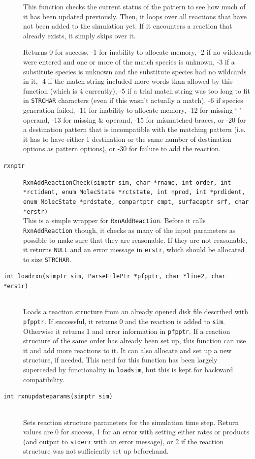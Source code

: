\documentclass {scrbook}
\newcommand {\ttt} {\texttt}
\begin{document}
\begin{description}
This function checks the current status of the pattern to see how much of it has been updated previously. Then, it loops over all reactions that have not been added to the simulation yet. If it encounters a reaction that already exists, it simply skips over it.

Returns 0 for success, -1 for inability to allocate memory, -2 if no wildcards were entered and one or more of the match species is unknown, -3 if a substitute species is unknown and the substitute species had no wildcards in it, -4 if the match string included more words than allowed by this function (which is 4 currently), -5 if a trial match string was too long to fit in \ttt{STRCHAR} characters (even if this wasn't actually a match), -6 if species generation failed, -11 for inability to allocate memory, -12 for missing ` ' operand, -13 for missing \& operand, -15 for mismatched braces, or -20 for a destination pattern that is incompatible with the matching pattern (i.e. it has to have either 1 destination or the same number of destination options as pattern options), or -30 for failure to add the reaction.

\item[\ttt{rxnptr}]
\ttt{RxnAddReactionCheck(simptr sim, char *rname, int order, int *rctident, enum MolecState *rctstate, int nprod, int *prdident, enum MolecState *prdstate, compartptr cmpt, surfaceptr srf, char *erstr)} \\
This is a simple wrapper for \ttt{RxnAddReaction}. Before it calls \ttt{RxnAddReaction} though, it checks as many of the input parameters as possible to make sure that they are reasonable. If they are not reasonable, it returns \ttt{NULL} and an error message in \ttt{erstr}, which should be allocated to size \ttt{STRCHAR}.

\item[\ttt{int loadrxn(simptr sim, ParseFilePtr *pfpptr, char *line2, char *erstr)}]
\hfill \\
Loads a reaction structure from an already opened disk file described with \ttt{pfpptr}. If successful, it returns 0 and the reaction is added to \ttt{sim}. Otherwise it returns 1 and error information in \ttt{pfpptr}. If a reaction structure of the same order has already been set up, this function can use it and add more reactions to it. It can also allocate and set up a new structure, if needed. This need for this function has been largely superceded by functionality in \ttt{loadsim}, but this is kept for backward compatibility.

\item[\ttt{int rxnupdateparams(simptr sim)}]
\hfill \\
Sets reaction structure parameters for the simulation time step. Return values are 0 for success, 1 for an error with setting either rates or products (and output to \ttt{stderr} with an error message), or 2 if the reaction structure was not sufficiently set up beforehand.


\end{description}
\end{document}
